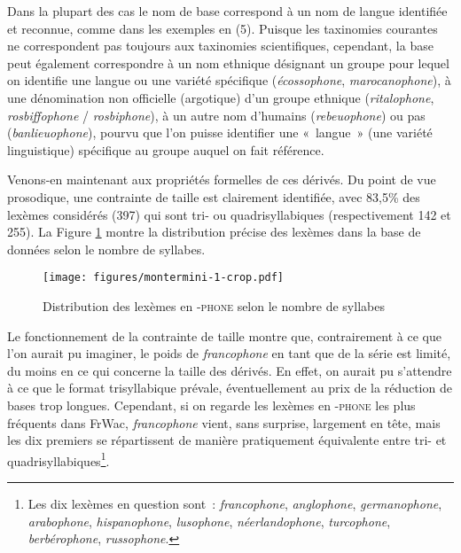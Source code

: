 \documentclass[output=paper]{langsci/langscibook}
\begin{document}
Dans la plupart des cas le nom de base correspond à un nom de langue
identifiée et reconnue, comme dans les exemples en (5). Puisque les
taxinomies courantes ne correspondent pas toujours aux taxinomies
scientifiques, cependant, la base peut également correspondre à un nom
ethnique désignant un groupe pour lequel on identifie une langue ou une
variété spécifique (\emph{écossophone}, \emph{marocanophone}), à une
dénomination non officielle (argotique) d'un groupe ethnique
(\emph{ritalophone}, \emph{rosbiffophone} / \emph{rosbiphone}), à un
autre nom d'humains (\emph{rebeuophone}) ou pas (\emph{banlieuophone}),
pourvu que l'on puisse identifier une «~langue~» (une variété
linguistique) spécifique au groupe auquel on fait référence.

Venons-en maintenant aux propriétés formelles de ces dérivés. Du point
de vue prosodique, une contrainte de taille est clairement identifiée,
avec 83,5\% des lexèmes considérés (397) qui sont tri- ou
quadrisyllabiques (respectivement 142 et 255). La Figure \ref{fig:Montermini:1} montre la
distribution précise des lexèmes dans la base de données selon le nombre
de syllabes.

\begin{figure} 
{\texttt{[image: figures/montermini-1-crop.pdf]}}
\caption{Distribution des lexèmes en \textsc{-phone} selon le
nombre de syllabes}
\label{fig:Montermini:1}
\end{figure}

Le fonctionnement de la contrainte de taille montre que, contrairement à
ce que l'on aurait pu imaginer, le poids de \emph{francophone} en tant
que  de la série est limité, du moins en ce qui concerne la
taille des dérivés. En effet, on aurait pu s'attendre à ce que le format
trisyllabique prévale, éventuellement au prix de la réduction de bases
trop longues. Cependant, si on regarde les lexèmes en \textsc{-phone}
les plus fréquents dans FrWac, \emph{francophone} vient, sans surprise,
largement en tête, mais les dix premiers se répartissent de manière
pratiquement équivalente entre tri- et quadrisyllabiques\footnote{Les
  dix lexèmes en question sont~: \emph{francophone}, \emph{anglophone},
  \emph{germanophone}, \emph{arabophone}, \emph{hispanophone},
  \emph{lusophone}, \emph{néerlandophone}, \emph{turcophone},
  \emph{berbérophone}, \emph{russophone}.}.
\end{document}
